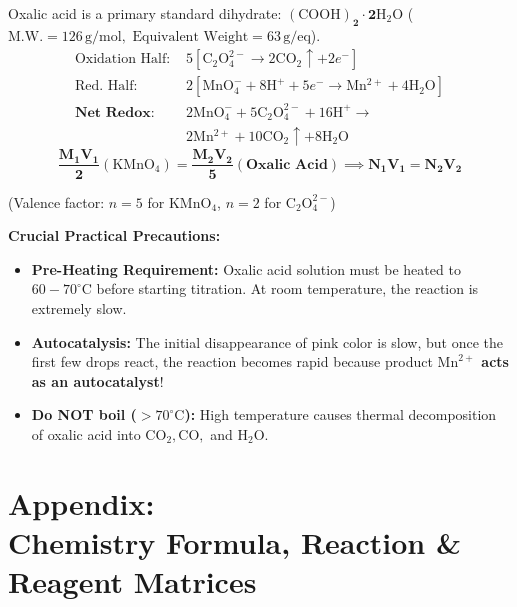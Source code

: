 \documentclass[10pt,twoside,openright]{book}
\begin{document}
\begin{formulabox}
Oxalic acid is a primary standard dihydrate: $\mathbf{(\mathrm{COOH})_2\cdot 2\mathrm{H_2O}}$ ($\mathrm{M.W.} = 126\,\mathrm{g/mol}, \text{ Equivalent Weight} = 63\,\mathrm{g/eq}$).
\begin{align*}
  \text{Oxidation Half: } & 5[\mathrm{C_2O_4^{2-}} \longrightarrow 2\mathrm{CO_2} \uparrow + 2e^-]\\
  \text{Red. Half: } & 2[\mathrm{MnO_4^-} + 8\mathrm{H}^+ + 5e^- \longrightarrow \mathrm{Mn^{2+}} + 4\mathrm{H_2O}]\\
  \textbf{Net Redox: } & 2\mathrm{MnO_4^-} + 5\mathrm{C_2O_4^{2-}} + 16\mathrm{H}^+ \longrightarrow \\
  &2\mathrm{Mn^{2+}} + 10\mathrm{CO_2} \uparrow + 8\mathrm{H_2O}
\end{align*}
\begin{equation}
  \mathbf{\frac{M_1 V_1}{2} (\mathrm{KMnO_4}) = \frac{M_2 V_2}{5} (\text{Oxalic Acid})} \implies \mathbf{N_1 V_1 = N_2 V_2}
\end{equation}
\centerline{\small (Valence factor: $n = 5$ for $\mathrm{KMnO_4}$, $n = 2$ for $\mathrm{C_2O_4^{2-}}$)}
\textbf{Crucial Practical Precautions:}
\begin{itemize}
  \item \textbf{Pre-Heating Requirement:} Oxalic acid solution must be heated to \textbf{$60-70^\circ\mathrm{C}$} before starting titration. At room temperature, the reaction is extremely slow.
  \item \textbf{Autocatalysis:} The initial disappearance of pink color is slow, but once the first few drops react, the reaction becomes rapid because product \textbf{$\mathrm{Mn}^{2+}$ acts as an autocatalyst}!
  \item \textbf{Do NOT boil ($>70^\circ\mathrm{C}$):} High temperature causes thermal decomposition of oxalic acid into $\mathrm{CO}_2, \mathrm{CO},$ and $\mathrm{H}_2\mathrm{O}$.
\end{itemize}
\end{formulabox}

\cleardoublepage
\appendix
\part*{\centering Appendix:\\[6pt]Chemistry Formula, Reaction \& Reagent Matrices}
\end{document}
